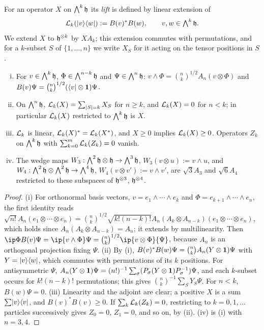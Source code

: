 For an operator $X$ on $\bigwedge^k\mathfrak{h}$ its \emph{lift} is defined by linear extension of
\begin{equation}\label{eq:lift}
\mathcal{L}_k(\lvert v\rangle\langle w\rvert):=B(v)^*B(w),\qquad v,w\in\textstyle\bigwedge^k\mathfrak{h} .
\end{equation}
We extend $X$ to $\mathfrak{h}^{\otimes k}$ by $XA_k$; this extension commutes with permutations, and for a $k$-subset $S$ of
$\{1,\dots,n\}$ we write $X_S$ for it acting on the tensor positions in $S$.

\begin{lemma}[lifts]\label{lem:lift}
\begin{enumerate}[(i)]
\item For $v\in\bigwedge^k\mathfrak{h}$, $\Phi\in\bigwedge^{n-k}\mathfrak{h}$ and $\Psi\in\bigwedge^n\mathfrak{h}$:
$v\wedge\Phi=\binom nk^{1/2}A_n(v\otimes\Phi)$ and $B(v)\Psi=\binom nk^{1/2}(\langle v\rvert\otimes\mathbf{1})\Psi$.
\item On $\bigwedge^n\mathfrak{h}$, $\mathcal{L}_k(X)=\sum_{\lvert S\rvert=k}X_S$ for $n\ge k$, and $\mathcal{L}_k(X)=0$ for $n<k$; in particular $\mathcal{L}_k(X)$
restricted to $\bigwedge^k\mathfrak{h}$ is $X$.
\item $\mathcal{L}_k$ is linear, $\mathcal{L}_k(X)^*=\mathcal{L}_k(X^*)$, and $X\ge0$ implies $\mathcal{L}_k(X)\ge0$. Operators $Z_k$ on $\bigwedge^k\mathfrak{h}$
with $\sum_{k=0}^{m}\mathcal{L}_k(Z_k)=0$ vanish.
\item The wedge maps $W_3:\bigwedge^2\mathfrak{h}\otimes\mathfrak{h}\to\bigwedge^3\mathfrak{h}$, $W_3(v\otimes u):=v\wedge u$, and
$W_4:\bigwedge^2\mathfrak{h}\otimes\bigwedge^2\mathfrak{h}\to\bigwedge^4\mathfrak{h}$, $W_4(v\otimes v'):=v\wedge v'$, are $\sqrt3A_3$ and $\sqrt6A_4$
restricted to these subspaces of $\mathfrak{h}^{\otimes3}$, $\mathfrak{h}^{\otimes4}$.
\end{enumerate}
\end{lemma}

\begin{proof}
(i) For orthonormal basis vectors, $v=e_1\wedge\cdots\wedge e_k$ and $\Phi=e_{k+1}\wedge\cdots\wedge e_n$, the first
identity reads $\sqrt{n!}A_n(e_1\otimes\cdots\otimes e_n)=\binom nk^{1/2}\sqrt{k!(n-k)!}A_n(A_k\otimes A_{n-k})(e_1\otimes\cdots\otimes e_n)$,
which holds since $A_n(A_k\otimes A_{n-k})=A_n$; it extends by multilinearity. Then
$\ip\Phi{B(v)\Psi}=\ip{v\wedge\Phi}\Psi=\binom nk^{1/2}\ip{v\otimes\Phi}{\Psi}$, because $A_n$ is an orthogonal
projection fixing $\Psi$. (ii) By (i), $B(v)^*B(w)\Psi=\binom nkA_n(Y\otimes\mathbf{1})\Psi$ with $Y=\lvert v\rangle\langle w\rvert$, which commutes with
permutations of its $k$ positions. For antisymmetric $\Psi$,
$A_n(Y\otimes\mathbf{1})\Psi=(n!)^{-1}\sum_\sigma(P_\sigma(Y\otimes\mathbf{1})P_\sigma^{-1})\Psi$, and each $k$-subset occurs for
$k!(n-k)!$ permutations; this gives $\binom nk^{-1}\sum_SY_S\Psi$. For $n<k$, $B(w)\Psi=0$. (iii) Linearity and the
adjoint are clear; a positive $X$ is a sum $\sum\lvert v\rangle\langle v\rvert$, and $B(v)^*B(v)\ge0$. If $\sum_k\mathcal{L}_k(Z_k)=0$, restricting to
$k=0,1,\dots$ particles successively gives $Z_0=0$, $Z_1=0$, and so on, by (ii). (iv) is (i) with $n=3,4$.
\end{proof}

